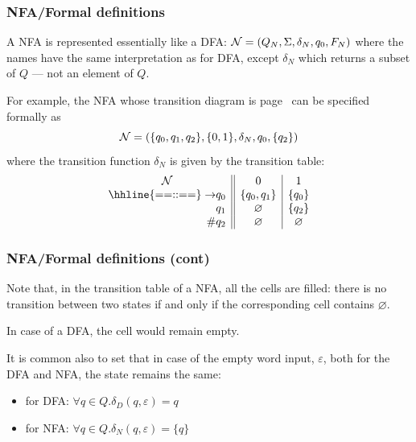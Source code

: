 %
\begin{frame}
\frametitle{NFA/Formal definitions}

\label{nfa_01_suffix_table}

A NFA is represented essentially like a DFA:
\(
{\cal N} = (Q_N, \Sigma, \delta_N, q_0, F_N)
\)
where the names have the same interpretation as for DFA, except
\(\delta_N\) which returns a subset of \(Q\) --- not an element of
\(Q\).

\bigskip

For example, the NFA whose transition diagram is
page~\pageref{nfa_01_suffix} can be specified formally as
\[
{\cal N} = (\{q_0, q_1, q_2\}, \{0, 1\}, \delta_N, q_0, \{q_2\})
\]
where the transition function \(\delta_N\) is given by the transition
table:
\[
\begin{array}{r@{}l||c|c}
\multicolumn{2}{c||}{\cal N} & 0 & 1\\
\hhline{==::==}
\rightarrow & q_0 & \{q_0, q_1\} & \{q_0\}\\
            & q_1 & \varnothing  & \{q_2\}\\
\#          & q_2 & \varnothing  & \varnothing
\end{array}
\]

\end{frame}

%
\begin{frame}
\frametitle{NFA/Formal definitions (cont)}

Note that, in the transition table of a NFA, all the cells are
filled: there is no transition between two states if and only if the
corresponding cell contains \(\varnothing\).

\bigskip

In case of a DFA, the cell would remain empty.

\bigskip

It is common also to set that in case of the empty word input,
\(\varepsilon\), both for the DFA and NFA, the state remains the
same:
\begin{itemize}

  \item for DFA: \(\forall q \in Q.\delta_D (q, \varepsilon) = q\)

  \item for NFA: \(\forall q \in Q.\delta_N (q, \varepsilon) = \{q\}\)

\end{itemize}

\end{frame}

